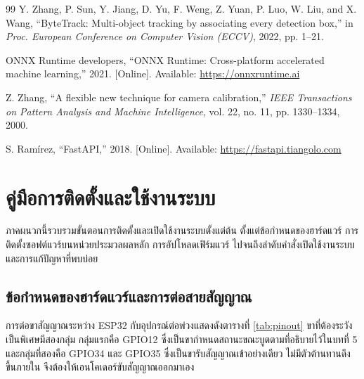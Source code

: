 \documentclass[a4paper,12pt]{report}
\makeatletter
\def\@thaialph#1{%
  \ifcase#1\or ก\or ข\or ค\or ง\or จ\or ฉ\or ช\or ซ\or ฌ\or ญ%
  \or ฎ\or ฏ\or ฐ\or ฑ\or ฒ\or ณ\or ด\or ต\or ถ\or ท%
  \or ธ\or น\or บ\or ป\or ผ\or ฝ\or พ\or ฟ\or ภ\or ม%
  \or ย\or ร\or ล\or ว\or ศ\or ษ\or ส\or ห\or ฬ\or อ\or ฮ%
  \else\@ctrerr\fi}
\newcommand{\thaialph}[1]{\expandafter\@thaialph\csname c@#1\endcsname}
\renewcommand{\cftchappresnum}{บทที่ }
\makeatother
\begin{document}
\begin{thebibliography}{99}
Y. Zhang, P. Sun, Y. Jiang, D. Yu, F. Weng, Z. Yuan, P. Luo, W. Liu, and X. Wang,
``ByteTrack: Multi-object tracking by associating every detection box,''
in \textit{Proc. European Conference on Computer Vision (ECCV)}, 2022, pp. 1--21.

ONNX Runtime developers,
``ONNX Runtime: Cross-platform accelerated machine learning,''
2021. [Online]. Available: \url{https://onnxruntime.ai}

Z. Zhang,
``A flexible new technique for camera calibration,''
\textit{IEEE Transactions on Pattern Analysis and Machine Intelligence},
vol. 22, no. 11, pp. 1330--1334, 2000.

S. Ram\'irez,
``FastAPI,''
2018. [Online]. Available: \url{https://fastapi.tiangolo.com}

\end{thebibliography}

\appendix
\renewcommand{\thechapter}{\thaialph{chapter}}

\addtocontents{toc}{\protect\renewcommand{\protect\cftchappresnum}{ภาคผนวก\protect\ }}

\chapter{คู่มือการติดตั้งและใช้งานระบบ}

ภาคผนวกนี้รวบรวมขั้นตอนการติดตั้งและเปิดใช้งานระบบตั้งแต่ต้น
ตั้งแต่ข้อกำหนดของฮาร์ดแวร์ การติดตั้งซอฟต์แวร์บนหน่วยประมวลผลหลัก
การอัปโหลดเฟิร์มแวร์ ไปจนถึงลำดับคำสั่งเปิดใช้งานระบบและการแก้ปัญหาที่พบบ่อย

\section{ข้อกำหนดของฮาร์ดแวร์และการต่อสายสัญญาณ}

การต่อขาสัญญาณระหว่าง ESP32 กับอุปกรณ์ต่อพ่วงแสดงดังตารางที่ \ref{tab:pinout}
ขาที่ต้องระวังเป็นพิเศษมีสองกลุ่ม กลุ่มแรกคือ GPIO12
ซึ่งเป็นขากำหนดสถานะขณะบูตตามที่อธิบายไว้ในบทที่ 5
และกลุ่มที่สองคือ GPIO34 และ GPIO35 ซึ่งเป็นขารับสัญญาณเข้าอย่างเดียว
ไม่มีตัวต้านทานดึงขึ้นภายใน จึงต้องให้เอนโคเดอร์ขับสัญญาณออกมาเอง
\end{document}
